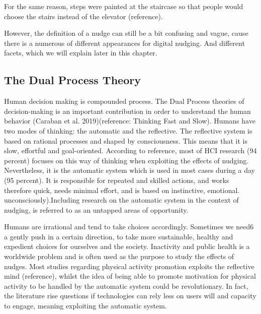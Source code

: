 {For the same reason, steps were painted at the staircase so that people would choose the stairs instead of the elevator (reference). 


However, the definition of a nudge can still be a bit confusing and vague, cause there is a numerous of different appearances for digital nudging. And different facets, which we will explain later in this chapter. 

\subsection{The Dual Process Theory}
Human decision making is compounded process. The Dual Process theories of decision-making is an important contribution in order to understand the human behavior (Caraban et al. 2019)(reference:  Thinking Fast and Slow). Humans have two modes of thinking: the automatic and the reflective. The reflective system is based on rational processes and shaped by consciousness. This means that it is slow, effortful and goal-oriented. According to reference, most of HCI research (94 percent) focuses on this way of thinking when exploiting the effects of nudging. Nevertheless, it is the automatic system which is used in most cases during a day (95 percent). It is responsible for repeated and skilled actions, and works therefore quick, needs minimal effort, and is based on instinctive, emotional.  unconsciously).Including research on the automatic system in the context of nudging, is referred to as an untapped areas of opportunity.

Humans are irrational and tend to take choices accordingly. Sometimes we need6
a gently push in a certain direction, to take more sustainable, healthy and expedient choices for ourselves and the society. Inactivity and public health is a worldwide problem  and  is  often  used  as  the  purpose  to  study  the  effects  of  nudges.   Most  studies regarding physical activity promotion exploits the reflective mind (reference), whilst the idea of being able to promote motivation for physical activity to be handled by the automatic system could be revolutionary. In fact,  the literature rise questions if technologies can rely less on users will and capacity to engage, meaning exploiting the automatic system.

}
